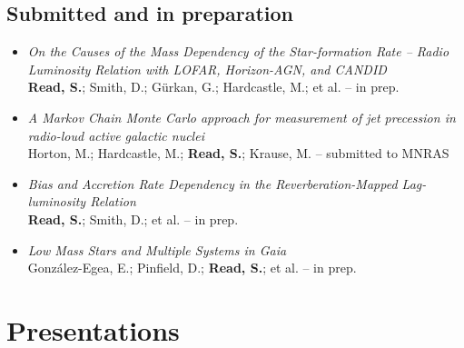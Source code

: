 \documentclass[letterpaper]{twentysecondcv} %
\begin{document}
\begin{finalpages}
\subsection{Submitted and in preparation}
\begin{itemize}
     \item \textit{On the Causes of the Mass Dependency of the Star-formation Rate -- Radio
Luminosity Relation with LOFAR, Horizon-AGN, and CANDID}\\{\small \textbf{Read, S.}; Smith, D.; Gürkan, G.; Hardcastle, M.; et al. -- in prep.}
 \item \textit{A Markov Chain Monte Carlo approach for measurement of jet precession in
radio-loud active galactic nuclei}\\{\small Horton, M.; Hardcastle, M.; \textbf{Read, S.}; Krause, M. -- submitted to MNRAS}
 \item \textit{Bias and Accretion Rate Dependency in the Reverberation-Mapped
Lag-luminosity Relation}\\{\small \textbf{Read, S.}; Smith, D.; et al. -- in prep.}
 \item \textit{Low Mass Stars and Multiple Systems in Gaia}\\{\small González-Egea, E.; Pinfield, D.; \textbf{Read, S.}; et al. -- in prep.}
\end{itemize}

\section{Presentations}
\begin{twentyfull}
\end{twentyfull}
\end{finalpages}
\end{document}
